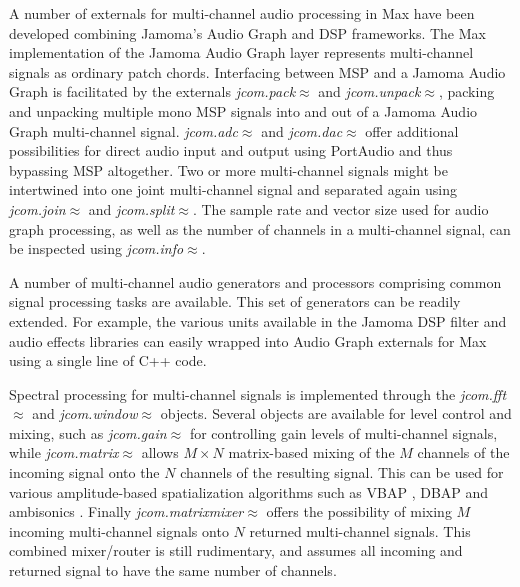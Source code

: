 \documentclass[twoside,a4paper]{article}
\begin{document}
A number of externals for multi-channel audio processing in Max have been developed combining Jamoma's Audio Graph and DSP frameworks. 
The Max implementation of the Jamoma Audio Graph layer represents multi-channel signals as ordinary patch chords.
Interfacing between MSP and a Jamoma Audio Graph is facilitated by the externals \emph{jcom.pack$\approx$} and \emph{jcom.unpack$\approx$}, packing and unpacking multiple mono MSP signals into and out of a Jamoma Audio Graph multi-channel signal. 
\emph{jcom.adc$\approx$} and \emph{jcom.dac$\approx$} offer additional possibilities for direct audio input and output using PortAudio \cite{Bencina:2003} and thus bypassing MSP altogether. 
Two or more multi-channel signals might be intertwined into one joint multi-channel signal and separated again using \emph{jcom.join$\approx$} and \emph{jcom.split$\approx$}.
The sample rate and vector size used for audio graph processing, as well as the number of channels in a multi-channel signal, can be inspected using \emph{jcom.info$\approx$}.

A number of multi-channel audio generators and processors comprising common signal processing tasks are available.
This set of generators can be readily extended.
For example, the various units available in the Jamoma DSP filter and audio effects libraries can easily wrapped into Audio Graph externals for Max using a single line of C++ code.

Spectral processing for multi-channel signals is implemented through the \emph{jcom.fft$\approx$} and \emph{jcom.window$\approx$} objects.
Several objects are available for level control and mixing, such as \emph{jcom.gain$\approx$} for controlling gain levels of multi-channel signals, while \emph{jcom.matrix$\approx$} allows $M \times N$ matrix-based mixing of the $M$ channels of the incoming signal onto the $N$ channels of the resulting signal. 
This can be used for various amplitude-based spatialization algorithms such as VBAP \cite{Pulkki:1997vbap}, DBAP \cite{lossius:2009} and ambisonics \cite{Schacher:2006ambi_max}.
Finally \emph{jcom.matrixmixer$\approx$} offers the possibility of mixing $M$ incoming multi-channel signals onto $N$ returned multi-channel signals.
This combined mixer/router is still rudimentary, and assumes all incoming and returned signal to have the same number of channels.
\end{document}
